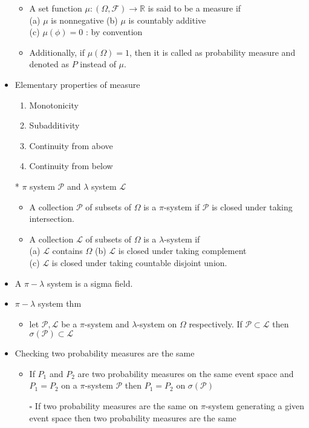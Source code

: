 \documentclass[12pt, A4]{article}
\begin{document}
\begin{itemize}
    \begin{itemize}
    	\item A set function $\mu : (\Omega, \mathcal{F})\rightarrow \mathbb{R}$ is said to be a measure if \\ (a) $\mu$ is nonnegative \quad (b) $\mu$ is countably additive \\ (c) $\mu(\phi)=0$ : by convention
    	\item Additionally, if $\mu(\Omega)=1$, then it is called as probability measure and denoted as $P$ instead of $\mu$.
    \end{itemize}
    \item Elementary properties of measure
    \begin{enumerate}
    	\item Monotonicity
    	\item Subadditivity
    	\item Continuity from above
    	\item Continuity from below
    \end{enumerate}

\clearpage

	\item[*] $\pi$ system $\mathcal{P}$ and $\lambda$ system $\mathcal{L}$
	\begin{itemize}
		\item A collection $\mathcal{P}$ of subsets of $\Omega$ is a $\pi$-system if $\mathcal{P}$ is closed under taking intersection.
		\item A collection $\mathcal{L}$ of subsets of $\Omega$ is a $\lambda$-system if \\(a) $\mathcal{L}$ contains $\Omega$ \quad (b) $\mathcal{L}$ is closed under taking complement \\(c) $\mathcal{L}$ is closed under taking countable disjoint union.
	\end{itemize}
	\item A $\pi-\lambda$ system is a sigma field.
	\item $\pi-\lambda$ system thm
	\begin{itemize}
		\item let $\mathcal{P}, \mathcal{L}$ be a $\pi$-system and $\lambda$-system on $\Omega$ respectively. \newline If $\mathcal{P} \subset \mathcal{L}$ then $\sigma(\mathcal{P})\subset \mathcal{L}$
	\end{itemize}
	\item Checking two probability measures are the same
	\begin{itemize}
	\item If $P_1$ and $P_2$ are two probability measures on the same event space and $P_1=P_2$ on a $\pi$-system $\mathcal{P}$ then $P_1=P_2$ on $\sigma(\mathcal{P})$ 
	\item[$\square$] If two probability measures are the same on $\pi$-system generating a given event space then two probability measures are the same	
    \end{itemize}
\end{itemize}
\clearpage
\end{document}
